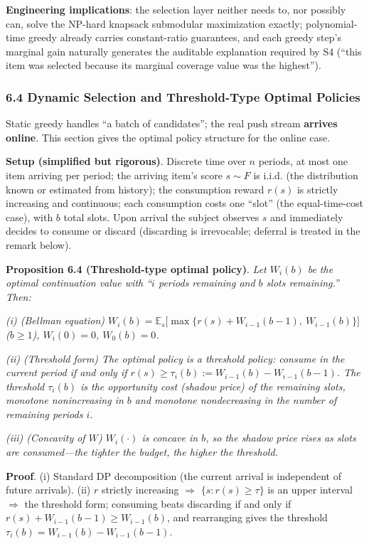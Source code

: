 \documentclass[
  11pt]{article}
\begin{document}
\textbf{Engineering implications}: the selection layer neither needs to,
nor possibly can, solve the NP-hard knapsack submodular maximization
exactly; polynomial-time greedy already carries constant-ratio
guarantees, and each greedy step's marginal gain naturally generates the
auditable explanation required by S4 (``this item was selected because
its marginal coverage value was the highest'').

\subsubsection{6.4 Dynamic Selection and Threshold-Type Optimal
Policies}\label{dynamic-selection-and-threshold-type-optimal-policies}

Static greedy handles ``a batch of candidates''; the real push stream
\textbf{arrives online}. This section gives the optimal policy structure
for the online case.

\textbf{Setup (simplified but rigorous)}. Discrete time over \(n\)
periods, at most one item arriving per period; the arriving item's score
\(s \sim F\) is i.i.d. (the distribution known or estimated from
history); the consumption reward \(r(s)\) is strictly increasing and
continuous; each consumption costs one ``slot'' (the equal-time-cost
case), with \(b\) total slots. Upon arrival the subject observes \(s\)
and immediately decides to consume or discard (discarding is
irrevocable; deferral is treated in the remark below).

\textbf{Proposition 6.4 (Threshold-type optimal policy)}. \emph{Let
\(W_i(b)\) be the optimal continuation value with ``\(i\) periods
remaining and \(b\) slots remaining.'' Then:}

\emph{(i) (Bellman equation)
\(W_i(b) = \mathbb{E}_s\big[\max\{r(s) + W_{i-1}(b-1),\ W_{i-1}(b)\}\big]\)
(\(b \ge 1\)), \(W_i(0) = 0\), \(W_0(b) = 0\).}

\emph{(ii) (Threshold form) The optimal policy is a threshold policy:
consume in the current period if and only if
\(r(s) \ge \tau_i(b) := W_{i-1}(b) - W_{i-1}(b-1)\). The threshold
\(\tau_i(b)\) is the opportunity cost (shadow price) of the remaining
slots, monotone nonincreasing in \(b\) and monotone nondecreasing in the
number of remaining periods \(i\).}

\emph{(iii) (Concavity of \(W\)) \(W_i(\cdot)\) is concave in \(b\), so
the shadow price rises as slots are consumed---the tighter the budget,
the higher the threshold.}

\textbf{Proof}. (i) Standard DP decomposition (the current arrival is
independent of future arrivals). (ii) \(r\) strictly increasing
\(\Rightarrow\) \(\{s: r(s) \ge \tau\}\) is an upper interval
\(\Rightarrow\) the threshold form; consuming beats discarding if and
only if \(r(s) + W_{i-1}(b-1) \ge W_{i-1}(b)\), and rearranging gives
the threshold \(\tau_i(b) = W_{i-1}(b) - W_{i-1}(b-1)\).
\end{document}
